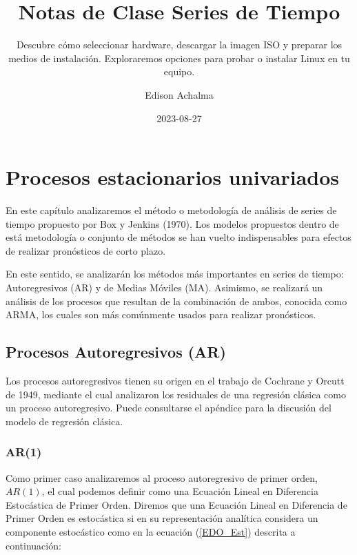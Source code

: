 \documentclass[
  a4paper,
]{article}
\title{Notas de Clase Series de Tiempo}
\subtitle{Descubre cómo seleccionar hardware, descargar la imagen ISO y
preparar los medios de instalación. Exploraremos opciones para probar o
instalar Linux en tu equipo.}
\author{Edison Achalma}
\date{2023-08-27}
\begin{document}
\maketitle
\ifdefined\Shaded\renewenvironment{Shaded}{\begin{tcolorbox}[boxrule=0pt, interior hidden, frame hidden, borderline west={3pt}{0pt}{shadecolor}, sharp corners, enhanced, breakable]}{\end{tcolorbox}}\fi

\hypertarget{procesos-estacionarios-univariados}{%
\section{Procesos estacionarios
univariados}\label{procesos-estacionarios-univariados}}

En este capítulo analizaremos el método o metodología de análisis de
series de tiempo propuesto por Box y Jenkins (1970). Los modelos
propuestos dentro de está metodología o conjunto de métodos se han
vuelto indispensables para efectos de realizar pronósticos de corto
plazo.

En este sentido, se analizarán los métodos más importantes en series de
tiempo: Autoregresivos (AR) y de Medias Móviles (MA). Asimismo, se
realizará un análisis de los procesos que resultan de la combinación de
ambos, conocida como ARMA, los cuales son más comúnmente usados para
realizar pronósticos.

\hypertarget{procesos-autoregresivos-ar}{%
\subsection{Procesos Autoregresivos
(AR)}\label{procesos-autoregresivos-ar}}

Los procesos autoregresivos tienen su origen en el trabajo de Cochrane y
Orcutt de 1949, mediante el cual analizaron los residuales de una
regresión clásica como un proceso autoregresivo. Puede consultarse el
apéndice para la discusión del modelo de regresión clásica.

\hypertarget{ar1}{%
\subsubsection{AR(1)}\label{ar1}}

Como primer caso analizaremos al proceso autoregresivo de primer orden,
\(AR(1)\), el cual podemos definir como una Ecuación Lineal en
Diferencia Estocástica de Primer Orden. Diremos que una Ecuación Lineal
en Diferencia de Primer Orden es estocástica si en su representación
analítica considera un componente estocástico como en la ecuación
(\ref{EDO_Est}) descrita a continuación:
\end{document}

